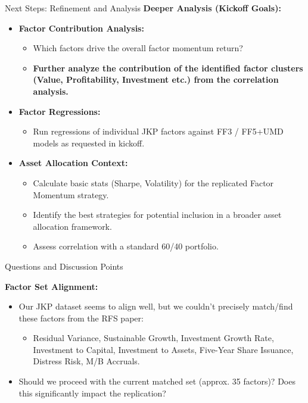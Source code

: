 \documentclass[t]{beamer}
\begin{document}
\begin{frame}{Next Steps: Refinement and Analysis}
    \vspace{0.5cm}
    \textbf{Deeper Analysis (Kickoff Goals):}
    \begin{itemize}
        \item \textbf{Factor Contribution Analysis:}
            \begin{itemize}
                \item Which factors drive the overall factor momentum return?
                \item \textbf{Further analyze the contribution of the identified factor clusters (Value, Profitability, Investment etc.) from the correlation analysis.}
            \end{itemize}
        \item \textbf{Factor Regressions:}
            \begin{itemize}
                \item Run regressions of individual JKP factors against FF3 / FF5+UMD models as requested in kickoff.
            \end{itemize}
        \item \textbf{Asset Allocation Context:}
            \begin{itemize}
                \item Calculate basic stats (Sharpe, Volatility) for the replicated Factor Momentum strategy.
                \item Identify the best strategies for potential inclusion in a broader asset allocation framework.
                \item Assess correlation with a standard 60/40 portfolio.
            \end{itemize}
    \end{itemize}

\end{frame}


\begin{frame}{Questions and Discussion Points}

    \textbf{Factor Set Alignment:}
    \begin{itemize}
        \item Our JKP dataset seems to align well, but we couldn't precisely match/find these factors from the RFS paper:
            \begin{itemize}
                \item \footnotesize Residual Variance, Sustainable Growth, Investment Growth Rate, Investment to Capital, Investment to Assets, Five-Year Share Issuance, Distress Risk, M/B Accruals.
            \end{itemize}
        \item Should we proceed with the current matched set (approx. 35 factors)? Does this significantly impact the replication?
    \end{itemize}
\end{frame}
\end{document}

